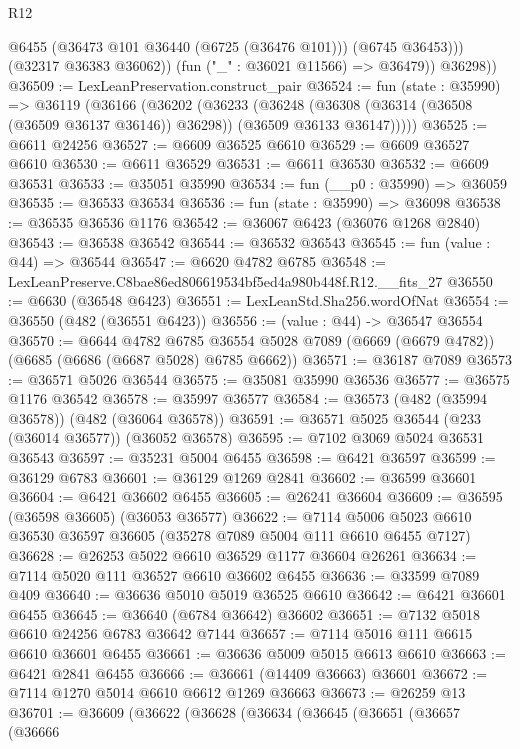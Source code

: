 \begin{lexlean}{R12}
\begin{coremodule}
                @6455
                (@36473 @101 @36440 (@6725 (@36476 @101)))
                (@6745 @36453)))
            (@32317 @36383 @36062))
          (fun ("_" : @36021 @11566) => @36479))
        @36298))
@36509 := LexLeanPreservation.construct_pair
@36524 := fun (state : @35990) =>
  @36119
    (@36166
      (@36202
        (@36233
          (@36248
            (@36308 (@36314 (@36508 (@36509 @36137 @36146)) @36298))
            (@36509 @36133 @36147)))))
@36525 := @6611 @24256
@36527 := @6609 @36525 @6610
@36529 := @6609 @36527 @6610
@36530 := @6611 @36529
@36531 := @6611 @36530
@36532 := @6609 @36531
@36533 := @35051 @35990
@36534 := fun (__p0 : @35990) => @36059
@36535 := @36533 @36534
@36536 := fun (state : @35990) => @36098
@36538 := @36535 @36536 @1176
@36542 := @36067 @6423 (@36076 @1268 @2840)
@36543 := @36538 @36542
@36544 := @36532 @36543
@36545 := fun (value : @44) => @36544
@36547 := @6620 @4782 @6785
@36548 := LexLeanPreserve.C8bae86ed806619534bf5ed4a980b448f.R12.__fits_27
@36550 := @6630 (@36548 @6423)
@36551 := LexLeanStd.Sha256.wordOfNat
@36554 := @36550 (@482 (@36551 @6423))
@36556 := (value : @44) -> @36547 @36554
@36570 := @6644
    @4782
    @6785
    @36554
    @5028
    @7089
    (@6669 (@6679 @4782))
    (@6685 (@6686 (@6687 @5028) @6785 @6662))
@36571 := @36187 @7089
@36573 := @36571 @5026 @36544
@36575 := @35081 @35990 @36536
@36577 := @36575 @1176 @36542
@36578 := @35997 @36577
@36584 := @36573 (@482 (@35994 @36578)) (@482 (@36064 @36578))
@36591 := @36571 @5025 @36544 (@233 (@36014 @36577)) (@36052 @36578)
@36595 := @7102 @3069 @5024 @36531 @36543
@36597 := @35231 @5004 @6455
@36598 := @6421 @36597
@36599 := @36129 @6783
@36601 := @36129 @1269 @2841
@36602 := @36599 @36601
@36604 := @6421 @36602 @6455
@36605 := @26241 @36604
@36609 := @36595 (@36598 @36605) (@36053 @36577)
@36622 := @7114 @5006 @5023 @6610 @36530 @36597 @36605 (@35278 @7089 @5004 @111 @6610 @6455 @7127)
@36628 := @26253 @5022 @6610 @36529 @1177 @36604 @26261
@36634 := @7114 @5020 @111 @36527 @6610 @36602 @6455
@36636 := @33599 @7089 @409
@36640 := @36636 @5010 @5019 @36525 @6610
@36642 := @6421 @36601 @6455
@36645 := @36640 (@6784 @36642) @36602
@36651 := @7132 @5018 @6610 @24256 @6783 @36642 @7144
@36657 := @7114 @5016 @111 @6615 @6610 @36601 @6455
@36661 := @36636 @5009 @5015 @6613 @6610
@36663 := @6421 @2841 @6455
@36666 := @36661 (@14409 @36663) @36601
@36672 := @7114 @1270 @5014 @6610 @6612 @1269 @36663
@36673 := @26259 @13
@36701 := @36609
    (@36622
      (@36628
        (@36634
          (@36645
            (@36651
              (@36657
                (@36666

\end{coremodule}
\end{lexlean}
